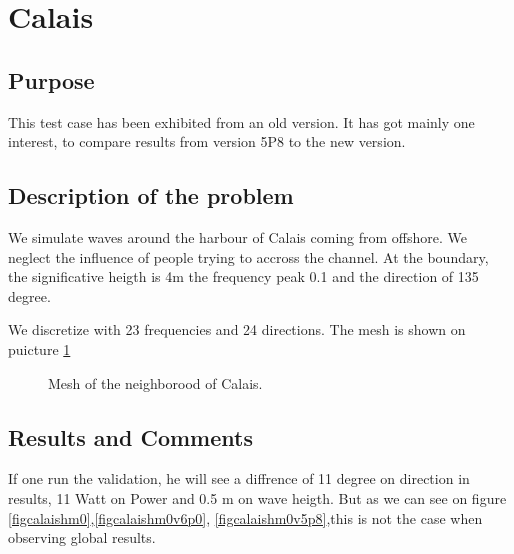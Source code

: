 \section{Calais}
%
%
\subsection{Purpose}
%
This test case has been exhibited from an old version. It has got mainly one interest, to compare results from version 5P8 to the new version.  

%
\subsection{Description of the problem}
We simulate waves around the harbour of Calais coming from offshore. We neglect the influence of people trying to accross the channel.
At the boundary, the significative heigth is 4m the frequency peak 0.1 and the direction of 135 degree.

We discretize with 23 frequencies and 24 directions. The mesh is shown on puicture \ref{figcalaismesh}

\begin{figure} [!h]
\centering
{}
 \caption{Mesh of the neighborood of Calais. }
\label{figcalaismesh}
\end{figure}

\subsection{Results and Comments}

If one run the validation, he will see a diffrence of 11 degree on direction in results, 11 Watt on Power and 0.5 m on wave heigth. But as we can see on figure  \ref{figcalaishm0},\ref{figcalaishm0v6p0}, \ref{figcalaishm0v5p8},this is not the case when observing global results.

